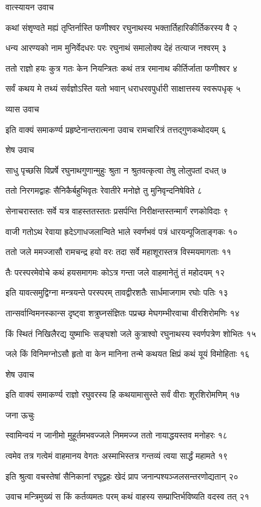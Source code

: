 वात्स्यायन उवाच

कथां संशृण्वते मह्यं तृप्तिर्नास्ति फणीश्वर
रघुनाथस्य भक्तार्तिहारिकीर्तिकरस्य वै २

धन्य आरण्यको नाम मुनिर्वेदधरः परः
रघुनाथं समालोक्य देहं तत्याज नश्वरम् ३

ततो राज्ञो हयः कुत्र गतः केन नियन्त्रितः
कथं तत्र रमानाथ कीर्तिर्जाता फणीश्वर ४

सर्वं कथय मे तथ्यं सर्वज्ञोऽस्ति यतो भवान्
धराधरवपुर्धारी साक्षात्तस्य स्वरूपधृक् ५

व्यास उवाच

इति वाक्यं समाकर्ण्य प्रहृष्टेनान्तरात्मना
उवाच रामचारित्रं तत्तद्गुणकथोदयम् ६

शेष उवाच

साधु पृच्छसि विप्रर्षे रघुनाथगुणान्मुहुः
श्रुता न श्रुतवत्कृत्वा तेषु लोलुपतां दधत् ७

ततो निरगमद्वाहः सैनिकैर्बहुभिवृतः
रेवातीरे मनोज्ञे तु मुनिवृन्दनिषेविते ८

सेनाचरास्ततः सर्वे यत्र वाहस्ततस्ततः
प्रसर्पन्ति निरीक्षन्तस्तन्मार्गं रणकोविदाः ९

वाजी गतोऽथ रेवाया ह्रदेऽगाधजलान्विते
भाले स्वर्णभवं पत्रं धारयन्पूजिताङ्गकः १०

ततो जले ममज्जासौ रामचन्द्र हयो वरः
तदा सर्वे महाशूरास्तत्र विस्मयमागताः ११

तैः परस्परमेवोचे कथं हयसमागमः
कोऽत्र गन्ता जले वाहमानेतुं तं महोदयम् १२

इति यावत्समुद्विग्ना मन्त्रयन्ते परस्परम्
तावद्वीरशतैः सार्धमाजगाम रघोः पतिः १३

तान्सर्वान्विमनस्कान्स दृष्ट्वा शत्रुघ्नसंज्ञितः
पप्रच्छ मेघगम्भीरवाचा वीरशिरोमणिः १४

किं स्थितं निखिलैरद्य युष्माभिः सङ्घशो जले
कुत्राश्वो रघुनाथस्य स्वर्णपत्रेण शोभितः १५

जले किं विनिमग्नोऽसौ हृतो वा केन मानिना
तन्मे कथयत क्षिप्रं कथं यूयं विमोहिताः १६

शेष उवाच

इति वाक्यं समाकर्ण्य राज्ञो रघुवरस्य हि
कथयामासुस्ते सर्वं वीराः शूरशिरोमणिम् १७

जना ऊचुः

स्वामिन्वयं न जानीमो मुहूर्तमभवज्जले
निममज्ज ततो नायाद्धयस्तव मनोहरः १८

त्वमेव तत्र गत्वेमं वाहमानय वेगतः
अस्माभिस्तत्र गन्तव्यं त्वया सार्द्धं महामते १९

इति श्रुत्वा वचस्तेषां सैनिकानां रघूद्वहः
खेदं प्राप जनान्पश्यञ्जलसन्तरणोद्यतान् २०

उवाच मन्त्रिमुख्यं स किं कर्तव्यमतः परम्
कथं वाहस्य सम्प्राप्तिर्भविष्यति वदस्व तत् २१

